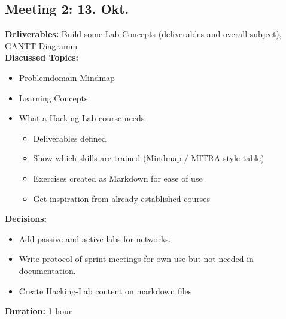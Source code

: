 \subsection*{Meeting 2: 13. Okt.}
\textbf{Deliverables:} Build some Lab Concepts (deliverables and overall subject), GANTT Diagramm \\
\textbf{Discussed Topics:} 
\begin{itemize}
    \item Problemdomain Mindmap
    \item Learning Concepts
    \item What a Hacking-Lab course needs
    \begin{itemize}
        \item Deliverables defined
        \item Show which skills are trained (Mindmap / MITRA style table)
        \item Exercises created as Markdown for ease of use 
        \item Get inspiration from already established courses
    \end{itemize}
\end{itemize}
\textbf{Decisions:} 
\begin{itemize}
    \item Add passive and active labs for networks.
    \item Write protocol of sprint meetings for own use but not needed in documentation.
    \item Create Hacking-Lab content on markdown files
\end{itemize} 
\textbf{Duration:} 1 hour


